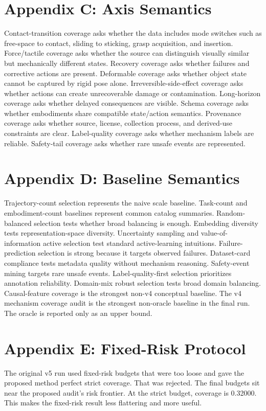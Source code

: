 \documentclass{article}
\begin{document}
\section{Appendix C: Axis Semantics}
Contact-transition coverage asks whether the data includes mode switches such as free-space to contact, sliding to sticking, grasp acquisition, and insertion. Force/tactile coverage asks whether the source can distinguish visually similar but mechanically different states. Recovery coverage asks whether failures and corrective actions are present. Deformable coverage asks whether object state cannot be captured by rigid pose alone. Irreversible-side-effect coverage asks whether actions can create unrecoverable damage or contamination. Long-horizon coverage asks whether delayed consequences are visible. Schema coverage asks whether embodiments share compatible state/action semantics. Provenance coverage asks whether source, license, collection process, and derived-use constraints are clear. Label-quality coverage asks whether mechanism labels are reliable. Safety-tail coverage asks whether rare unsafe events are represented.

\section{Appendix D: Baseline Semantics}
Trajectory-count selection represents the naive scale baseline. Task-count and embodiment-count baselines represent common catalog summaries. Random-balanced selection tests whether broad balancing is enough. Embedding diversity tests representation-space diversity. Uncertainty sampling and value-of-information active selection test standard active-learning intuitions. Failure-prediction selection is strong because it targets observed failures. Dataset-card compliance tests metadata quality without mechanism reasoning. Safety-event mining targets rare unsafe events. Label-quality-first selection prioritizes annotation reliability. Domain-mix robust selection tests broad domain balancing. Causal-feature coverage is the strongest non-v4 conceptual baseline. The v4 mechanism coverage audit is the strongest non-oracle baseline in the final run. The oracle is reported only as an upper bound.

\section{Appendix E: Fixed-Risk Protocol}
The original v5 run used fixed-risk budgets that were too loose and gave the proposed method perfect strict coverage. That was rejected. The final budgets sit near the proposed audit's risk frontier. At the strict budget, coverage is 0.32000. This makes the fixed-risk result less flattering and more useful.
\end{document}
